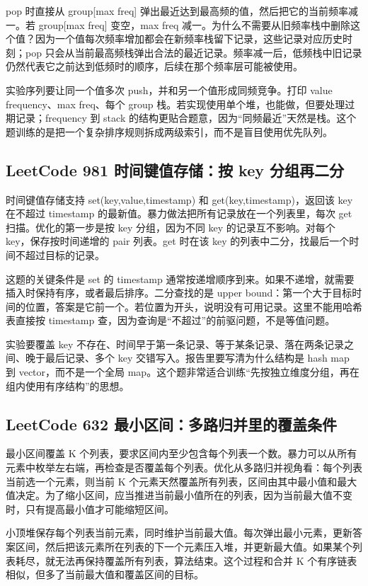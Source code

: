 pop 时直接从 group[max freq] 弹出最近达到最高频的值，然后把它的当前频率减一。若 group[max freq] 变空，max freq 减一。为什么不需要从旧频率栈中删除这个值？因为一个值每次频率增加都会在新频率栈留下记录，这些记录对应历史时刻；pop 只会从当前最高频栈弹出合法的最近记录。频率减一后，低频栈中旧记录仍然代表它之前达到低频时的顺序，后续在那个频率层可能被使用。

实验序列要让同一个值多次 push，并和另一个值形成同频竞争。打印 value frequency、max freq、每个 group 栈。若实现使用单个堆，也能做，但要处理过期记录；frequency 到 stack 的结构更贴合题意，因为“同频最近”天然是栈。这个题训练的是把一个复杂排序规则拆成两级索引，而不是盲目使用优先队列。

\subsection{LeetCode 981 时间键值存储：按 key 分组再二分}

时间键值存储支持 set(key,value,timestamp) 和 get(key,timestamp)，返回该 key 在不超过 timestamp 的最新值。暴力做法把所有记录放在一个列表里，每次 get 扫描。优化的第一步是按 key 分组，因为不同 key 的记录互不影响。对每个 key，保存按时间递增的 pair 列表。get 时在该 key 的列表中二分，找最后一个时间不超过目标的记录。

这题的关键条件是 set 的 timestamp 通常按递增顺序到来。如果不递增，就需要插入时保持有序，或者最后排序。二分查找的是 upper bound：第一个大于目标时间的位置，答案是它前一个。若位置为开头，说明没有可用记录。这里不能用哈希表直接按 timestamp 查，因为查询是“不超过”的前驱问题，不是等值问题。

实验要覆盖 key 不存在、时间早于第一条记录、等于某条记录、落在两条记录之间、晚于最后记录、多个 key 交错写入。报告里要写清为什么结构是 hash map 到 vector，而不是一个全局 map。这个题非常适合训练“先按独立维度分组，再在组内使用有序结构”的思想。

\subsection{LeetCode 632 最小区间：多路归并里的覆盖条件}

最小区间覆盖 K 个列表，要求区间内至少包含每个列表一个数。暴力可以从所有元素中枚举左右端，再检查是否覆盖每个列表。优化从多路归并视角看：每个列表当前选一个元素，则当前 K 个元素天然覆盖所有列表，区间由其中最小值和最大值决定。为了缩小区间，应当推进当前最小值所在的列表，因为当前最大值不变时，只有提高最小值才可能缩短区间。

小顶堆保存每个列表当前元素，同时维护当前最大值。每次弹出最小元素，更新答案区间，然后把该元素所在列表的下一个元素压入堆，并更新最大值。如果某个列表耗尽，就无法再保持覆盖所有列表，算法结束。这个过程和合并 K 个有序链表相似，但多了当前最大值和覆盖区间的目标。

